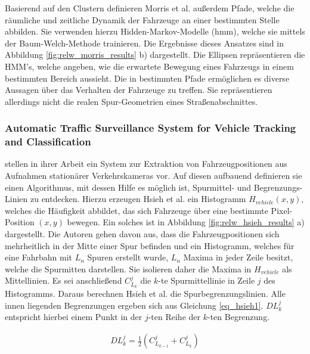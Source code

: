 Basierend auf den Clustern definieren Morris et al. außerdem Pfade, welche die räumliche und zeitliche Dynamik
der Fahrzeuge an einer bestimmten Stelle abbilden. Sie verwenden hierzu Hidden-Markov-Modelle (\acrshort*{hmm}),
welche sie mittels der Baum-Welch-Methode trainieren.
Die Ergebnisse dieses Ansatzes sind in Abbildung \ref{fig:relw_morris_results} b) dargestellt. Die
Ellipsen repräsentieren die HMM's, welche angeben, wie die erwartete Bewegung eines Fahrzeugs in einem
bestimmten Bereich aussieht.
Die in \cite[]{Morris2011} bestimmten Pfade ermöglichen es diverse Aussagen über das Verhalten der Fahrzeuge
zu treffen. Sie repräsentieren allerdings nicht die realen Spur-Geometrien eines Straßenabschnittes.

\subsubsection*{Automatic Traffic Surveillance System for Vehicle Tracking and Classification}

\cite[]{Hsieh2006} stellen in ihrer Arbeit ein System zur Extraktion von Fahrzeugpositionen aus Aufnahmen
stationärer Verkehrskameras vor. Auf diesen aufbauend definieren sie einen Algorithmus, mit dessen Hilfe es
möglich ist, Spurmittel- und Begrenzungs-Linien zu entdecken.
Hierzu erzeugen Hsieh et al. ein Histogramm $H_{vehicle}(x,y)$, welches die Häufigkeit abbildet, das sich Fahrzeuge über eine
bestimmte Pixel-Position $(x, y)$ bewegen. Ein solches ist in Abbildung \ref{fig:relw_hsieh_results} a) dargestellt.
Die Autoren gehen davon aus, dass die Fahrzeugpositionen sich mehrheitlich in der Mitte einer Spur befinden und
ein Histogramm, welches für eine Fahrbahn mit $L_n$ Spuren erstellt wurde, $L_n$ Maxima in jeder Zeile besitzt,
welche die Spurmitten darstellen.
Sie isolieren daher die Maxima in $H_{vehicle}$ als Mittellinien. Es sei anschließend $C_{L_k}^{j}$ die $k$-te Spurmittellinie
in Zeile $j$ des Histogramms. Daraus berechnen Hsieh et al. die Spurbegrenzungslinien. Alle innen liegenden
Begrenzungen ergeben sich aus Gleichung \ref{eq_hsieh1}. $DL_{k}^{j}$ entspricht hierbei einem Punkt
in der $j$-ten Reihe der $k$-ten Begrenzung.

\begin{ceqn}
\begin{align}
\label{eq_hsieh1}
    DL_{k}^{j} = \frac{1}{2} (C_{L_{k-1}}^{j} + C_{L_{k}}^{j})
\end{align}
\end{ceqn}

